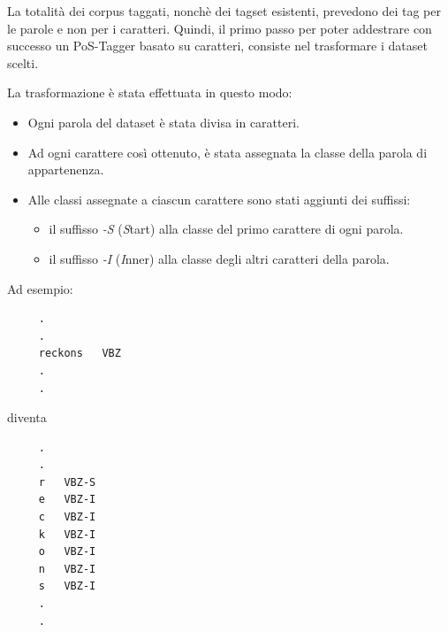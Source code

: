 La totalit\`a dei corpus taggati, nonch\`e dei tagset esistenti, prevedono dei tag
per le parole e non per i caratteri. Quindi, il primo passo per poter addestrare
con successo un PoS-Tagger basato su caratteri, consiste nel trasformare i dataset
scelti.

La trasformazione \`e stata effettuata in questo modo:
\begin{itemize}
  \item Ogni parola del dataset \`e stata divisa in caratteri.
  \item Ad ogni carattere cos\`i ottenuto, \`e stata assegnata la classe della
        parola di appartenenza.
  \item Alle classi assegnate a ciascun carattere sono stati aggiunti dei suffissi:
  \begin{itemize}
    \item il suffisso \emph{-S} (\emph{S}tart) alla classe del primo carattere
          di ogni parola.
    \item il suffisso \emph{-I} (\emph{I}nner) alla classe degli altri caratteri
          della parola.
  \end{itemize}
\end{itemize}

Ad esempio:

\begin{center}
  \begin{minipage}{5cm}
    \begin{verbatim}
     .
     .
     reckons   VBZ
     .
     .
    \end{verbatim}
  \end{minipage}
\end{center}

diventa

\begin{center}
  \begin{minipage}{5cm}
    \begin{verbatim}
     .
     .
     r   VBZ-S
     e   VBZ-I
     c   VBZ-I
     k   VBZ-I
     o   VBZ-I
     n   VBZ-I
     s   VBZ-I
     .
     .
    \end{verbatim}
  \end{minipage}
\end{center}


